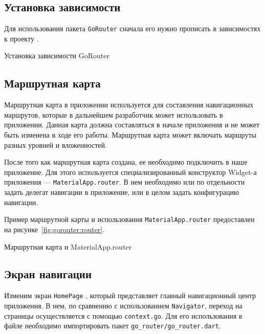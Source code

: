 \subsection{Установка зависимости}

Для использования пакета \texttt{GoRouter} сначала его нужно
прописать в зависимостях к проекту .

\begin{image}
	\caption{Установка зависимости GoRouter}
	\label{fig:gorouter:dep}
\end{image}

\subsection{Маршрутная карта}

Маршрутная карта в приложении используется
для составления навигационных маршрутов,
которые в дальнейшем разработчик может использовать в приложении.
Данная карта должна составляться в начале приложения
и не может быть изменена в ходе его работы.
Маршрутная карта может включать маршруты разных уровней и вложенностей.\par
После того как маршрутная карта создана,
ее необходимо подключить в наше приложение.
Для этого используется специализированный конструктор
Widget-а приложения --- \texttt{MaterialApp.router}.
В нем необходимо или по отдельности задать делегат навигации в приложение,
или в целом задать конфигурацию навигации.

Пример маршрутной карты и использования \texttt{MaterialApp.router}
предоставлен на рисунке~\ref{fig:gorouter:router}.

\begin{image}
	\caption{Маршрутная карта и MaterialApp.router}
	\label{fig:gorouter:router}
\end{image}

\subsection{Экран навигации}

Изменим экран \texttt{HomePage} ,
который представляет главный навигационный центр приложения.
В нем, по сравнению с использованием \texttt{Navigator},
переход на страницы осуществляется с помощью \texttt{context.go}.
Для его использования в файле необходимо импортировать
пакет \verb|go_router/go_router.dart|.

